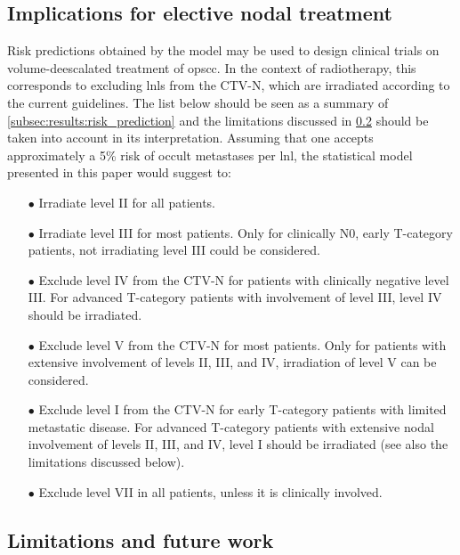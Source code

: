 \documentclass[twocolumn]{aastex631}
\newcommand{\ju}[1]{{\textcolor{red}{#1}}}
\begin{document}
\subsection{Implications for elective nodal treatment} 
Risk predictions obtained by the model may be used to design clinical trials on volume-deescalated treatment of \gls{opscc}. In the context of radiotherapy, this corresponds to excluding \glspl{lnl} from the CTV-N, which are irradiated according to the current guidelines. The list below should be seen as a summary of \cref{subsec:results:risk_prediction} and the limitations discussed in \cref{subsec:disc:limitation} should be taken into account in its interpretation. Assuming that one accepts approximately a 5\% risk of occult metastases per \gls{lnl}, the statistical model presented in this paper would suggest to:
\begin{itemize}
    \item[$\bullet$] Irradiate level II for all patients.%
    \item[$\bullet$] Irradiate level III for most patients. Only for clinically N0, early T-category patients, not irradiating level III could be considered. 
    \item[$\bullet$] Exclude level IV from the CTV-N for patients with clinically negative level III. For advanced T-category patients with involvement of level III, level IV should be irradiated.
    \item[$\bullet$] Exclude level V from the CTV-N for most patients. Only for patients with extensive involvement of levels II, III, and IV, irradiation of level V can be considered.
    \item[$\bullet$] Exclude level I from the CTV-N for early T-category patients with limited metastatic disease. For advanced T-category patients with extensive nodal involvement of levels II, III, and IV, level I should be irradiated (see also the limitations discussed below).
    \item[$\bullet$] Exclude level VII in all patients, unless it is clinically involved.
\end{itemize}

\subsection{Limitations and future work}
\label{subsec:disc:limitation}
\end{document}
